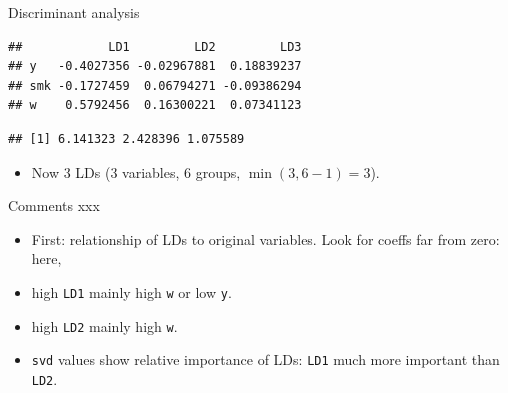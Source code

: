 \documentclass[ignorenonframetext,]{beamer}
\newenvironment{Shaded}{\begin{snugshade}}{\end{snugshade}}
\newcommand{\DataTypeTok}[1]{\textcolor[rgb]{0.13,0.29,0.53}{#1}}
\newcommand{\FloatTok}[1]{\textcolor[rgb]{0.00,0.00,0.81}{#1}}
\newcommand{\KeywordTok}[1]{\textcolor[rgb]{0.13,0.29,0.53}{\textbf{#1}}}
\newcommand{\NormalTok}[1]{#1}
\newcommand{\OperatorTok}[1]{\textcolor[rgb]{0.81,0.36,0.00}{\textbf{#1}}}
\newcommand{\StringTok}[1]{\textcolor[rgb]{0.31,0.60,0.02}{#1}}
\providecommand{\tightlist}{%
  \setlength{\itemsep}{0pt}\setlength{\parskip}{0pt}}
\begin{document}
\begin{frame}[fragile]{Discriminant analysis}
\protect\hypertarget{discriminant-analysis-2}{}

\small

\begin{Shaded}
\end{Shaded}

\begin{verbatim}
##            LD1         LD2         LD3
## y   -0.4027356 -0.02967881  0.18839237
## smk -0.1727459  0.06794271 -0.09386294
## w    0.5792456  0.16300221  0.07341123
\end{verbatim}

\begin{Shaded}
\end{Shaded}

\begin{verbatim}
## [1] 6.141323 2.428396 1.075589
\end{verbatim}

\normalsize

\begin{itemize}
\tightlist
\item
  Now 3 LDs (3 variables, 6 groups, \(\min(3,6-1)=3\)).
\end{itemize}

\end{frame}

\begin{frame}[fragile]{Comments xxx}
\protect\hypertarget{comments-xxx}{}

\begin{itemize}
\item
  First: relationship of LDs to original variables. Look for coeffs far
  from zero: here,
\item
  high \texttt{LD1} mainly high \texttt{w} or low \texttt{y}.
\item
  high \texttt{LD2} mainly high \texttt{w}.
\item
  \texttt{svd} values show relative importance of LDs: \texttt{LD1} much
  more important than \texttt{LD2}.
\end{itemize}

\end{frame}
\end{document}
